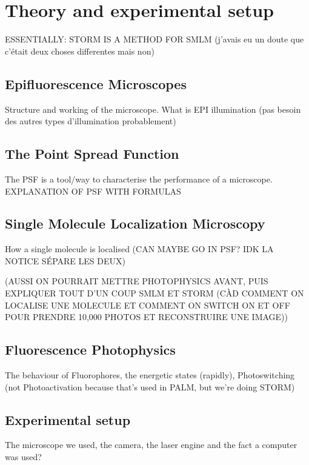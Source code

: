 \section{Theory and experimental setup}
ESSENTIALLY: STORM IS A METHOD FOR SMLM (j'avais eu un doute que c'était deux choses differentes mais non)

\subsection{Epifluorescence Microscopes}
Structure and working of the microscope.
What is EPI illumination (pas besoin des autres types d'illumination probablement)


\subsection{The Point Spread Function}
The PSF is a tool/way to characterise the performance of a microscope.
EXPLANATION OF PSF WITH FORMULAS


\subsection{Single Molecule Localization Microscopy}
How a single molecule is localised (CAN MAYBE GO IN PSF? IDK LA NOTICE SÉPARE LES DEUX)

(AUSSI ON POURRAIT METTRE PHOTOPHYSICS AVANT, PUIS EXPLIQUER TOUT D'UN COUP SMLM ET STORM (CÀD COMMENT ON LOCALISE UNE MOLECULE ET COMMENT ON SWITCH ON ET OFF POUR PRENDRE 10,000 PHOTOS ET RECONSTRUIRE UNE IMAGE))


\subsection{Fluorescence Photophysics}
The behaviour of Fluorophores, the energetic states (rapidly), Photoswitching (not Photoactivation because that's used in PALM, but we're doing STORM)


\subsection{Experimental setup}
The microscope we used, the camera, the laser engine and the fact a computer was used?


